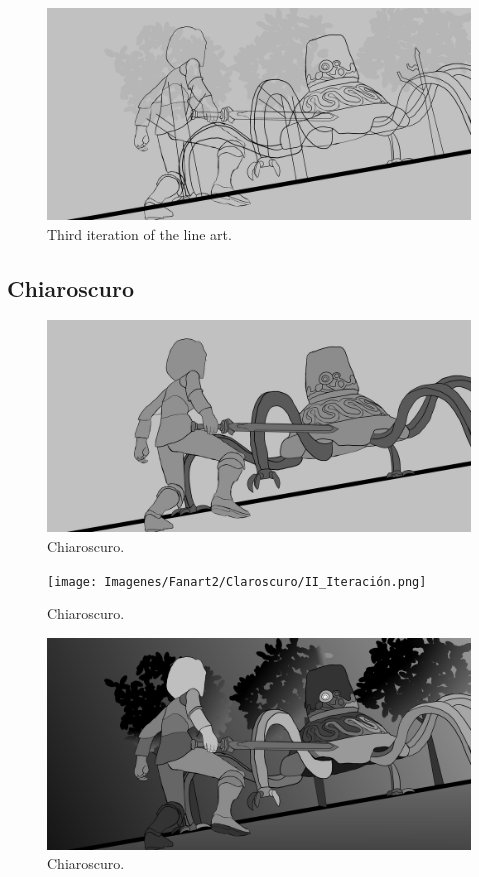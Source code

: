 \documentclass{cup-pan}
\begin{document}
        \begin{figure}[H]
            \includegraphics[width=\textwidth]{Imagenes/Fanart2/Boceto_Lineart/III Iteracion_2o_FanArt_LineArt.png}
            \caption{Third iteration of the line art.}
        \end{figure}

    \subsection{Chiaroscuro}

        \begin{figure}[H]
            \includegraphics[width=\textwidth]{Imagenes/Fanart2/Claroscuro/I_Iteracion.png}
            \caption{Chiaroscuro.}
        \end{figure}

        \begin{figure}[H]
            \texttt{[image: Imagenes/Fanart2/Claroscuro/II\_Iteración.png]}
            \caption{Chiaroscuro.}
        \end{figure}

        \begin{figure}[H]
            \includegraphics[width=\textwidth]{Imagenes/Fanart2/Claroscuro/III_Iteraion.png}
            \caption{Chiaroscuro.}
        \end{figure}
\end{document}
